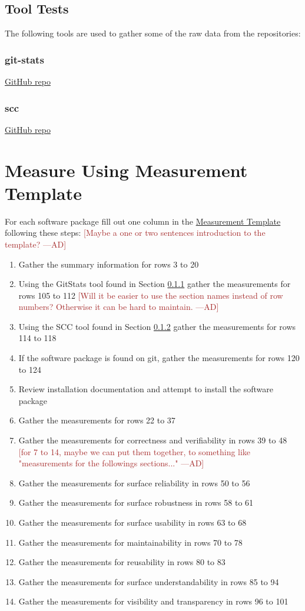 \documentclass[letterpaper,cleveref]{lipics-v2019}
\newcommand{\authornote}[3]{\textcolor{#1}{[#3 ---#2]}}
\newcommand{\authornote}[3]{}
\newcommand{\ad}[1]{\authornote{brown}{AD}{#1}} %
\theoremstyle{definition}
\begin{document}
\subsection{Tool Tests}
The following tools are used to gather some of the raw data from the repositories:

\subsubsection{git-stats}\label{gitstats}
\href{https://github.com/tomgi/git_stats}{GitHub repo}

\subsubsection{scc}\label{scc}
\href{https://github.com/boyter/scc}{GitHub repo}

\section{Measure Using Measurement Template} \label{SecShallowMeasure}
For each software package fill out one column in the \href{run:Combined_MeasurementTemplate_EmpiricalMeasures.xlsx}{Measurement Template} following these steps:
\ad{Maybe a one or two sentences introduction to the template?}
\begin{enumerate}
	\item Gather the summary information for rows 3 to 20
	\item Using the GitStats tool found in Section \ref{gitstats} gather the measurements for rows 105 to 112
	\ad{Will it be easier to use the section names instead of row numbers? Otherwise it can be hard to maintain.}
	\item Using the SCC tool found in Section \ref{scc} gather the measurements for rows 114 to 118
	\item If the software package is found on git, gather the measurements for rows 120 to 124
	\item Review installation documentation and attempt to install the software package
	\item Gather the measurements for rows 22 to 37
	\item Gather the measurements for correctness and verifiability in rows 39 to 48
	\ad{for 7 to 14, maybe we can put them together, to something like "measurements for the followings sections..."}
	\item Gather the measurements for surface reliability in rows 50 to 56
	\item Gather the measurements for surface robustness in rows 58 to 61
	\item Gather the measurements for surface usability in rows 63 to 68
	\item Gather the measurements for maintainability in rows 70 to 78
	\item Gather the measurements for reusability in rows 80 to 83
	\item Gather the measurements for surface understandability in rows 85 to 94
	\item Gather the measurements for visibility and transparency in rows 96 to 101
\end{enumerate}
\end{document}
